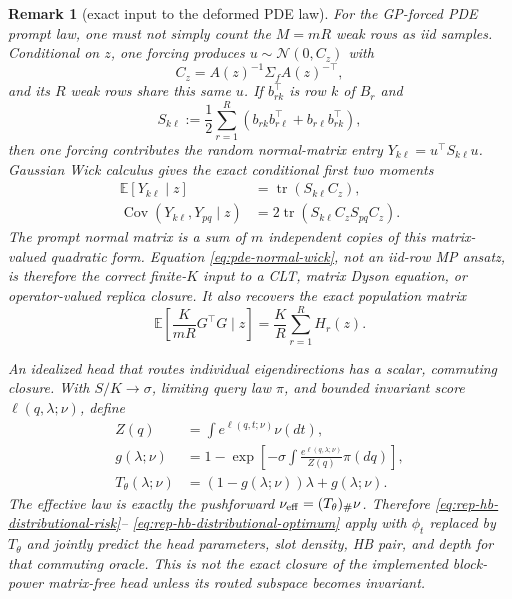 \documentclass[11pt,a4paper]{article}
\newtheorem{remark}{Remark}
\theoremstyle{definition}
\newcommand{\E}{\mathbb E}
\newcommand{\tr}{\operatorname{tr}}
\begin{document}
\begin{remark}[exact input to the deformed PDE law]
For the GP-forced PDE prompt law, one must not simply count the $M=mR$ weak
rows as iid samples.  Conditional on $z$, one forcing produces
$u\sim\mathcal N(0,C_z)$ with
\[
    C_z=A(z)^{-1}\Sigma_fA(z)^{-\top},
\]
and its $R$ weak rows share this same $u$.  If $b_{rk}^\top$ is row $k$ of
$B_r$ and
\[
    S_{k\ell}
    :=\frac12\sum_{r=1}^R
    (b_{rk}b_{r\ell}^\top+b_{r\ell}b_{rk}^\top),
\]
then one forcing contributes the random normal-matrix entry
$Y_{k\ell}=u^\top S_{k\ell}u$.  Gaussian Wick calculus gives the exact
conditional first two moments
\begin{align}
    \E[Y_{k\ell}\mid z]
    &=\tr(S_{k\ell}C_z),\\
    \operatorname{Cov}(Y_{k\ell},Y_{pq}\mid z)
    &=2\tr(S_{k\ell}C_zS_{pq}C_z).
    \label{eq:pde-normal-wick}
\end{align}
The prompt normal matrix is a sum of $m$ independent copies of this
\emph{matrix-valued quadratic form}.  Equation \eqref{eq:pde-normal-wick},
not an iid-row MP ansatz, is therefore the correct finite-$K$ input to a CLT,
matrix Dyson equation, or operator-valued replica closure.  It also recovers
the exact population matrix
\[
    \E\left[\frac K{mR}G^\top G\mid z\right]
    =\frac KR\sum_{r=1}^R H_r(z).
\]

An idealized head that routes individual eigendirections has a scalar,
commuting closure.  With \(S/K\to\sigma\), limiting query law \(\pi\), and
bounded invariant score \(\ell(q,\lambda;\nu)\), define
\begin{align*}
    Z(q)&=\int e^{\ell(q,t;\nu)}\nu(dt),\\
    g(\lambda;\nu)
    &=1-\exp\left[-\sigma\int
      \frac{e^{\ell(q,\lambda;\nu)}}{Z(q)}\pi(dq)\right],\\
    T_\theta(\lambda;\nu)&=(1-g(\lambda;\nu))\lambda+g(\lambda;\nu).
\end{align*}
The effective law is exactly the pushforward
$\nu_{\rm eff}=(T_\theta)_\#\nu$.  Therefore
\eqref{eq:rep-hb-distributional-risk}--
\eqref{eq:rep-hb-distributional-optimum} apply with $\phi_t$ replaced by
$T_\theta$ and jointly predict the head parameters, slot density, HB pair,
and depth for that commuting oracle.  This is not the exact closure of the
implemented block-power matrix-free head unless its routed subspace becomes
invariant.


\end{remark}
\end{document}
